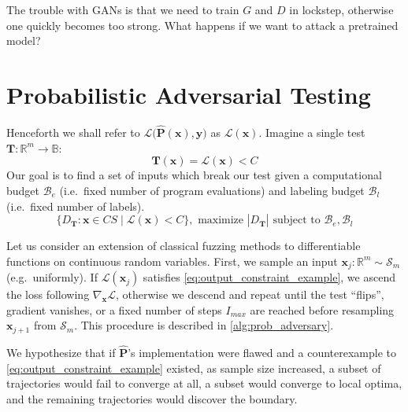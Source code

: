 The trouble with GANs is that we need to train $G$ and $D$ in lockstep, otherwise one quickly becomes too strong. What happens if we want to attack a pretrained model?
%
\section{Probabilistic Adversarial Testing}\label{sec:prob_ad_test}

\noindent Henceforth we shall refer to $\mathcal{L}\big(\mathbf{\hat P}(\mathbf{x}), \mathbf{y}\big)$ as $\mathcal{L}(\mathbf x)$. Imagine a single test $\mathbf{T}: \mathbb{R}^m \rightarrow \mathbb{B}$:
%
\begin{equation} \label{eq:output_constraint_example}
\mathbf T(\mathbf{x}) = \mathcal{L}(\mathbf{x}) < C
\end{equation}
%
Our goal is to find a set of inputs which break our test given a computational budget $\mathcal{B}_e$ (i.e.\ fixed number of program evaluations) and labeling budget $\mathcal{B}_l$ (i.e.\ fixed number of labels).
%
\begin{equation}
\{ D_\mathbf T: \mathbf x \in CS \mid \mathcal{L}(\mathbf{x}) < C\}, \text{ maximize } |D_\mathbf T| \text { subject to } \mathcal{B}_e, \mathcal{B}_l
\end{equation}
%

Let us consider an extension of classical fuzzing methods to differentiable functions on continuous random variables. First, we sample an input $\mathbf{x}_j: \mathbb{R}^m \sim \mathcal S_m$ (e.g.\ uniformly). If $\mathcal{L}(\mathbf{x}_j)$ satisfies \autoref{eq:output_constraint_example}, we ascend the loss following $\nabla_{\mathbf x}\mathcal{L}$, otherwise we descend and repeat until the test ``flips'', gradient vanishes, or a fixed number of steps $I_{max}$ are reached before resampling $\mathbf{x}_{j+1}$ from $\mathcal S_m$. This procedure is described in \autoref{alg:prob_adversary}.

We hypothesize that if $\mathbf{\hat P}$'s implementation were flawed and a counterexample to \autoref{eq:output_constraint_example} existed, as sample size increased, a subset of trajectories would fail to converge at all, a subset would converge to local optima, and the remaining trajectories would discover the boundary.

